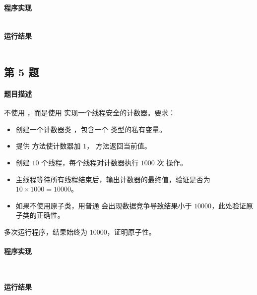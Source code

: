 \documentclass{academics}
\begin{document}
\paragraph{程序实现} {
    \inputminted[label=CountDownLatchDemo.java]{java}{../src/P04/CountDownLatchDemo.java}
}

\paragraph{运行结果} {
    \inputminted{text}{../res/P04.out}
}

\subsection{第 5 题}

\paragraph{题目描述} {
    不使用 ，而是使用  实现一个线程安全的计数器。要求：
    \begin{itemize}
        \item 创建一个计数器类 ，包含一个  类型的私有变量。
        \item 提供  方法使计数器加 $1$， 方法返回当前值。
        \item 创建 $10$ 个线程，每个线程对计数器执行 $1000$ 次  操作。
        \item 主线程等待所有线程结束后，输出计数器的最终值，验证是否为 $10 \times 1000 = 10000$。
        \item 如果不使用原子类，用普通  会出现数据竞争导致结果小于 $10000$，此处验证原子类的正确性。
    \end{itemize}
    多次运行程序，结果始终为 $10000$，证明原子性。
}

\paragraph{程序实现} {
    \inputminted[label=Counter.java]{java}{../src/P05/Counter.java}
    \inputminted[label=AtomicCounter.java]{java}{../src/P05/AtomicCounter.java}
}

\paragraph{运行结果} {
    \inputminted{text}{../res/P05.out}
}
\end{document}
